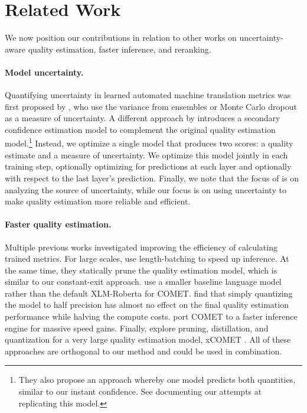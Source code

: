 \section{Related Work}
We now position our contributions in relation to other works on uncertainty-aware quality estimation, faster inference, and reranking.


\paragraph{Model uncertainty.}
Quantifying uncertainty in learned automated machine translation metrics was first proposed by \citet{glushkova-etal-2021-uncertainty-aware}, who use the variance from ensembles or Monte Carlo dropout as a measure of uncertainty.
A different approach by \citet{zerva-etal-2022-disentangling} introduces a secondary confidence estimation model to complement the original quality estimation model.\footnote{
They also propose an approach whereby one model predicts both quantities, similar to our instant confidence.
See  documenting our attempts at replicating this model.
}
Instead, we optimize a single model that produces two scores: a quality estimate and a measure of uncertainty.
We optimize this model jointly in each training step, optionally optimizing for predictions at each layer and optionally with respect to the last layer's prediction.
Finally, we note that the focus of \citet{zerva-etal-2022-disentangling} is on analyzing the source of uncertainty, while our focus is on using uncertainty to make quality estimation more reliable and efficient.

\paragraph{Faster quality estimation.}
Multiple previous works investigated improving the efficiency of calculating trained metrics.
For large scales, \citet{rei-etal-2022-searching} use length-batching to speed up inference.
At the same time, they statically prune the quality estimation model, which is similar to our constant-exit approach.
\citet{cheng2024bayesianoptimizationapproachmachine} use a smaller baseline language model rather than the default XLM-Roberta for COMET.
\citet{zouhar-etal-2024-pitfalls} find that simply quantizing the model to half precision has almost no effect on the final quality estimation performance while halving the compute costs.
\citet{gowda-etal-2023-cometoid,gowda-etal-2024-pymarian} port COMET to a faster inference engine for massive speed gains.
Finally, \citet{larionov2024xcometlitebridginggapefficiency} explore pruning, distillation, and quantization for a very large quality estimation model, xCOMET \citep{guerreiro-etal-2024-xcomet}.
All of these approaches are orthogonal to our method
and could be used in combination.

